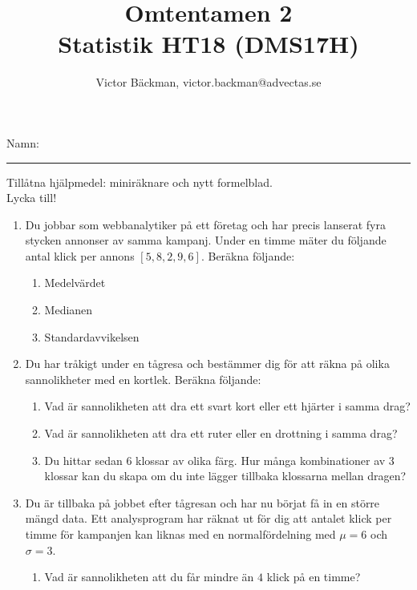 \documentclass[a4paper,10pt]{article}
\title{Omtentamen 2\\ {Statistik HT18 (DMS17H)}}
\author{Victor Bäckman, victor.backman@advectas.se}
\begin{document}
\maketitle
\vspace{2cm}
Namn:
{\rule{13cm}{0.4pt}}
\vspace{5cm}
\begin{center}
  Tillåtna hjälpmedel: miniräknare och nytt formelblad.\\
    \vspace{3cm}
  {\huge Lycka till!}
\end{center}

\newpage
\begin{enumerate}
  \item{Du jobbar som webbanalytiker på ett företag och har precis lanserat fyra stycken annonser av samma kampanj. Under en timme mäter du följande antal klick per annons $[5, 8, 2, 9, 6]$}. Beräkna följande:
    \begin{enumerate}
      \item{Medelvärdet}
      \vspace{6cm}
      \item{Medianen}
      \vspace{4cm}
      \item{Standardavvikelsen}
    \end{enumerate}
\newpage
  \item{Du har tråkigt under en tågresa och bestämmer dig för att räkna på olika sannolikheter med en kortlek. Beräkna följande:}
    \begin{enumerate}
      \item{Vad är sannolikheten att dra ett svart kort eller ett hjärter i samma drag?}
      \vspace{8cm}
      \item{Vad är sannolikheten att dra ett ruter eller en drottning i samma drag?}
      \newpage
      \item{Du hittar sedan $6$ klossar av olika färg. Hur många kombinationer av $3$ klossar kan du skapa om du inte lägger tillbaka klossarna mellan dragen?}
    \end{enumerate}
\newpage
  \item{Du är tillbaka på jobbet efter tågresan och har nu börjat få in en större mängd data. Ett analysprogram har räknat ut för dig att antalet klick per timme för kampanjen kan liknas med en normalfördelning med $\mu=6$ och $\sigma=3$.}
    \begin{enumerate}
      \item{Vad är sannolikheten att du får mindre än $4$ klick på en timme?}

\end{enumerate}
\end{enumerate}
\end{document}

